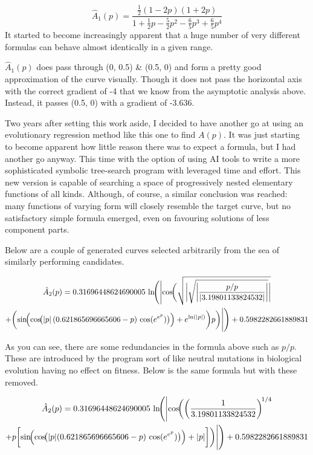 $$\hat A_1(p) = \frac{\frac{1}{2}(1-2p)(1+2p)}{1 + \frac{1}{2}p - \frac{5}{2}p^2 - \frac{6}{5}p^3 + \frac{6}{5}p^4}$$
It started to become increasingly apparent that a huge number of very different formulas can behave almost identically in a given range. 

$\hat A_1(p)$ does pass through (0, 0.5) \& (0.5, 0) and form a pretty good approximation of the curve visually. Though it does not pass the horizontal axis with the correct gradient of -4 that we know from the asymptotic analysis above. Instead, it passes (0.5, 0) with a gradient of -3.636.

\vspace{10pt}
\noindent
Two years after setting this work aside, I decided to have another go at using an evolutionary regression method like this one to find $A(p)$.
It was just starting to become apparent how little reason there was to expect a formula, but I had another go anyway. This time with the option of using AI tools to write a 
more sophisticated symbolic tree-search program with leveraged time and effort. This new version is capable of searching a space of progressively nested elementary functions of all kinds. Although, of course, a similar
conclusion was reached: many functions of varying form will closely resemble the target curve, but no satisfactory simple formula emerged, even on favouring solutions of less component parts.

Below are a couple of generated curves selected arbitrarily from the sea of similarly performing candidates.

\begin{multline*}
\hat A_2(p) = 0.31696448624690005 \,
\ln\!\Biggl(
\Biggl|
\cos\!\biggl(
\sqrt{
\biggl|
\sqrt{
\biggl|
\frac{p/p}{| 3.19801133824532 |}
\biggr|
}
\biggr|
} \\
+
\biggl(
\sin\!\Bigl(
\cos\!\bigl(
|p| \,
(0.621865696665606 - p)\,
\cos(e^{e^{p}})
\bigr)
\Bigr)
+
e^{\ln(|p|)}
\biggr) p
\biggr)
\Biggr|
\Biggr)
+ 0.5982282661889831
\end{multline*}

\noindent
As you can see, there are some redundancies in the formula above such as $p/p$. These are introduced by the program sort of like neutral mutations in biological evolution having no effect on fitness. Below is the same formula but with these removed.

\begin{multline*}
\hat A_2(p) = 0.31696448624690005 \,
\ln\!\Biggl(
\Biggl|
\cos\!\biggl(
\left( \frac{1}{3.19801133824532} \right)^{\!1/4} \\
+
p \biggl[
\sin\!\Bigl(
\cos\!\bigl(
|p| (0.621865696665606 - p)\,
\cos(e^{e^{p}})
\bigr)
\Bigr)
+
|p|
\biggr]
\biggr)
\Biggr|
\Biggr)
+ 0.5982282661889831
\end{multline*}


